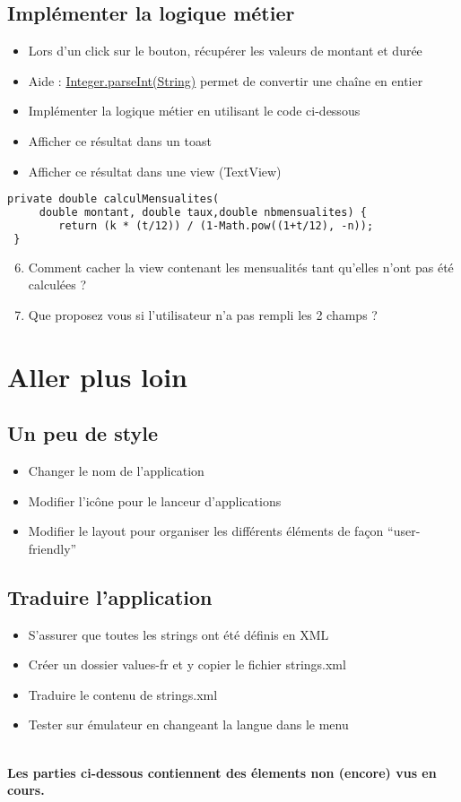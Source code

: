 \documentclass{article}
\begin{document}
\subsection{Implémenter la logique métier}
\begin{itemize}
\item Lors d'un click sur le bouton, récupérer les valeurs de montant et durée
\item Aide : \href{http://developer.android.com/reference/java/lang/Integer.html#parseInt(java.lang.String)}{Integer.parseInt(String)} permet de convertir une chaîne en entier
\item Implémenter la logique métier en utilisant le code ci-dessous
\item Afficher ce résultat dans un toast
\item Afficher ce résultat dans une view (TextView)
\end{itemize}
 \begin{lstlisting}[language=XML]
 private double calculMensualites(
     double montant, double taux,double nbmensualites) {
    	return (k * (t/12)) / (1-Math.pow((1+t/12), -n));
 }
\end{lstlisting}

\begin{enumerate}
 \setcounter{enumi}{5}
\item Comment cacher la view contenant les mensualités tant qu'elles n'ont pas été calculées ?
\item Que proposez vous si l'utilisateur n'a pas rempli les 2 champs ?
\end{enumerate}
\newpage
\section{Aller plus loin}
\subsection{Un peu de style}
\begin{itemize}
\item Changer le nom de l'application
\item Modifier l'icône pour le lanceur d'applications
\item Modifier le layout pour organiser les différents éléments de façon ``user-friendly''
\end{itemize}
\subsection{Traduire l'application}
\begin{itemize}
\item S'assurer que toutes les strings ont été définis en XML
\item Créer un dossier values-fr et y copier le fichier strings.xml
\item Traduire le contenu de strings.xml
\item Tester sur émulateur en changeant la langue dans le menu
\end{itemize}
\\\*
\textbf{Les parties ci-dessous contiennent des élements non (encore) vus en cours.}
\end{document}
